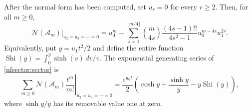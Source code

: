 \begin{theorem}
\label{nfsector:trigamma}
After the normal form has been computed, set $u_r=0$ for every $r\ge2$.
Then, for all $m\ge0$,
\begin{equation}\label{nfsector:sector}
 \left.\mathcal N(\mathcal A_m)\right|_{u_2=u_3=\cdots=0}
 =u_0^m-
 \sum_{s=1}^{\lfloor m/4\rfloor}
 \binom{m}{4s}\frac{(4s-1)!!}{4s^2-1}
       u_0^{m-4s}u_1^{2s}.
\end{equation}
Equivalently, put $y=u_1t^2/2$ and define the entire function
$\operatorname{Shi}(y)=\int_0^y\sinh(v)\,dv/v$.  The exponential
generating series of \eqref{nfsector:sector} is
\begin{equation}\label{nfsector:Shi}
 \left.\sum_{m\ge0}\mathcal N(\mathcal A_m)\frac{t^m}{m!}
       \right|_{u_2=u_3=\cdots=0}
 =\frac{e^{u_0t}}2
       \left(\cosh y+\frac{\sinh y}{y}-y\operatorname{Shi}(y)\right),
\end{equation}
where $\sinh y/y$ has its removable value one at zero.
\end{theorem}
